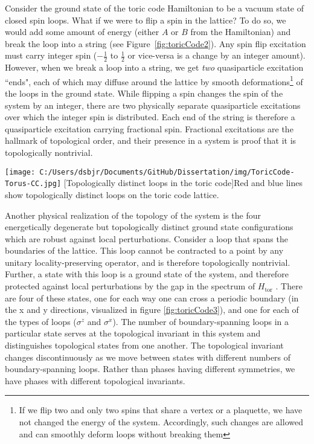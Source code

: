 Consider the ground state of the toric code Hamiltonian to be a vacuum state of closed spin loops. What if we were to flip a spin in the lattice? To do so, we would add some amount of energy (either $A$ or $B$ from the Hamiltonian) and break the loop into a string (see Figure~\ref{fig:toricCode2}). Any spin flip excitation must carry integer spin ($-\frac{1}{2}$ to $\frac{1}{2}$ or vice-versa is a change by an integer amount). However, when we break a loop into a string, we get \textit{two} quasiparticle excitation ``ends", each of which may diffuse around the lattice by smooth deformations\footnote{If we flip two and only two spins that share a vertex or a plaquette, we have not changed the energy of the system. Accordingly, such changes are allowed and can smoothly deform loops without breaking them} of the loops in the ground state. While flipping a spin changes the spin of the system by an integer, there are two physically separate quasiparticle excitations over which the integer spin is distributed. Each end of the string is therefore a quasiparticle excitation carrying fractional spin. Fractional excitations are the hallmark of topological order, and their presence in a system is proof that it is topologically nontrivial.

\begin{centering}
\texttt{[image: C:/Users/dsbjr/Documents/GitHub/Dissertation/img/ToricCode-Torus-CC.jpg]}
  \captionsetup{width=0.75\textwidth}
  [Topologically distinct loops in the toric code]{Red and blue lines show topologically distinct loops on the toric code lattice.}
  \label{fig:toricCode3}
\end{centering}

Another physical realization of the topology of the system is the four energetically degenerate but topologically distinct ground state configurations which are robust against local perturbations. Consider a loop that spans the boundaries of the lattice. This loop cannot be contracted to a point by any unitary locality-preserving operator, and is therefore topologically nontrivial. Further, a state with this loop is a ground state of the system, and therefore protected against local perturbations by the gap in the spectrum of $H_{\text{tor}}$ \cite{Bravyi2010}. There are four of these states, one for each way one can cross a periodic boundary (in the x and y directions, visualized in figure \ref{fig:toricCode3}), and one for each of the types of loops ($\sigma^{z}$ and $\sigma^{x}$). The number of boundary-spanning loops in a particular state serves at the topological invariant in this system and distinguishes topological states from one another. The topological invariant changes discontinuously as we move between states with different numbers of boundary-spanning loops. Rather than phases having different symmetries, we have phases with different topological invariants.

